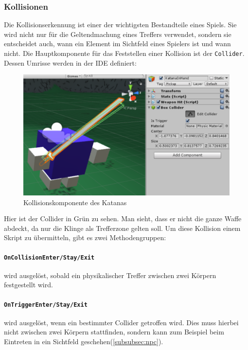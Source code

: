 \subsubsection{Kollisionen}
\label{subsubsec:collider}
Die Kollisionserkennung ist einer der wichtigsten Bestandteile eines Spiels. Sie wird nicht nur für die Geltendmachung eines Treffers verwendet, sondern sie entscheidet auch, wann  ein Element im Sichtfeld eines Spielers ist und wann nicht.
Die Hauptkomponente für das Feststellen einer Kollision ist der \lstinline{Collider}.
Dessen Umrisse werden in der IDE definiert:
\begin{figure}[H]
\includegraphics[scale=0.8]{screenshots/katanacollider.png}
\caption{Kollisionskomponente des Katanas}
\end{figure}
\noindent Hier ist der Collider in Grün zu sehen. Man sieht, dass er nicht die ganze Waffe abdeckt, da nur die Klinge als Trefferzone gelten soll.
Um diese Kollision einem Skript zu übermitteln, gibt es zwei Methodengruppen:
\paragraph{\lstinline{OnCollisionEnter/Stay/Exit}} wird ausgelöst, sobald ein physikalischer Treffer zwischen zwei Körpern festgestellt wird.
\paragraph{\lstinline{OnTriggerEnter/Stay/Exit}} wird ausgelöst, wenn ein bestimmter Collider getroffen wird. Dies muss hierbei nicht zwischen zwei Körpern stattfinden, sondern kann zum Beispiel beim Eintreten in ein Sichtfeld geschehen(\cref{subsubsec:npc}).






